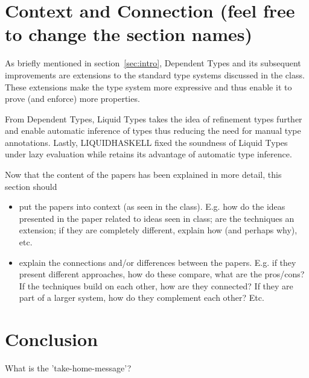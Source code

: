 \documentclass[a4paper,UKenglish]{lipics-v2016}
\begin{document}
\section{Context and Connection (feel free to change the section names)}

  As briefly mentioned in section~\ref{sec:intro}, Dependent Types and its
  subsequent improvements are extensions to the standard type systems discussed
  in the class.  These extensions make the type system more expressive and thus
  enable it to prove (and enforce) more properties.

  From Dependent Types, Liquid Types takes the idea of refinement types further
  and enable automatic inference of types thus reducing the need for manual
  type annotations.  Lastly, LIQUIDHASKELL fixed the soundness of Liquid Types
  under lazy evaluation while retains its advantage of automatic type
  inference.

  Now that the content of the papers has been explained in more detail,
  this section should
  \begin{itemize}
    \item put the papers into context (as seen in the class). E.g. how do the
    ideas presented in the paper related to ideas seen in class; are the techniques
    an extension; if they are completely different, explain how (and perhaps why), etc.

    \item explain the connections and/or differences between the papers.
      E.g. if they present different approaches, how do these compare, what are the pros/cons?
      If the techniques build on each other, how are they connected?
      If they are part of a larger system, how do they complement each other?
      Etc.

  \end{itemize}

\section{Conclusion}

  What is the 'take-home-message'?





\end{document}
